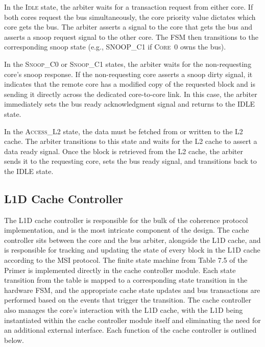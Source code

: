 \documentclass[10pt, compsoc]{IEEEtran}
\begin{document}
In the \textsc{Idle} state, the arbiter waits for a transaction request from either core. If both cores request the bus simultaneously, the core priority value dictates which core gets the bus. The arbiter asserts a signal to the core that gets the bus and asserts a snoop request signal to the other core. The FSM then transitions to the corresponding snoop state (e.g., \textsc{SNOOP\_C1} if \textsc{Core\ 0} owns the bus).



In the \textsc{Snoop\_C0} or \textsc{Snoop\_C1} states, the arbiter waits for the non-requesting core's snoop response. If the non-requesting core asserts a snoop dirty signal, it indicates that the remote core has a modified copy of the requested block and is sending it directly across the dedicated core-to-core link. In this case, the arbiter immediately sets the bus ready acknowledgment signal and returns to the \textsc{IDLE} state. 



In the \textsc{Access\_L2} state, the data must be fetched from or written to the L2 cache. The arbiter transitions to this state and waits for the L2 cache to assert a data ready signal. Once the block is retrieved from the L2 cache, the arbiter sends it to the requesting core, sets the bus ready signal, and transitions back to the \textsc{IDLE} state.



\subsection{L1D Cache Controller}

The L1D cache controller is responsible for the bulk of the coherence protocol implementation, and is the most intricate component of the design. The cache controller sits between the core and the bus arbiter, alongside the L1D cache, and is responsible for tracking and updating the state of every block in the L1D cache according to the MSI protocol. The finite state machine from Table 7.5 of the Primer \cite{primer} is implemented directly in the cache controller module. Each state transition from the table is mapped to a corresponding state transition in the hardware FSM, and the appropriate cache state updates and bus transactions are performed based on the events that trigger the transition. The cache controller also manages the core's interaction with the L1D cache, with the L1D being instantiated within the cache controller module itself and eliminating the need for an additional external interface. Each function of the cache controller is outlined below. 
\end{document}
